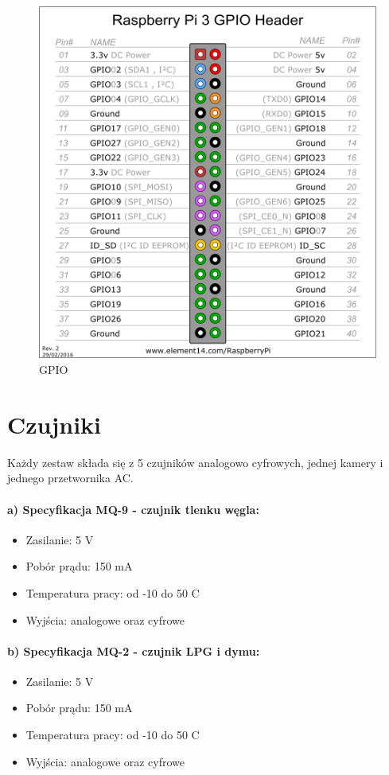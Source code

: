 \begin{figure}[h]
\begin{minipage}[b]{0.4\textwidth}
    \includegraphics[width=\textwidth]{gpio.png}
    \caption{GPIO}
  \end{minipage}
\end{figure}

\section*{Czujniki}

Każdy zestaw składa się z 5 czujników analogowo cyfrowych,  jednej kamery i jednego przetwornika AC. 
\paragraph{a) Specyfikacja MQ-9 - czujnik tlenku węgla:}
\begin{itemize} 
\item Zasilanie: 5 V
\item Pobór prądu: 150 mA
\item Temperatura pracy: od -10 do 50 \textdegree{}C
\item Wyjścia: analogowe oraz cyfrowe
\end{itemize}

\paragraph{b) Specyfikacja MQ-2 - czujnik LPG i dymu:}
\begin{itemize} 
\item Zasilanie: 5 V
\item Pobór prądu: 150 mA
\item Temperatura pracy: od -10 do 50 \textdegree{}C
\item Wyjścia: analogowe oraz cyfrowe
\end{itemize}

